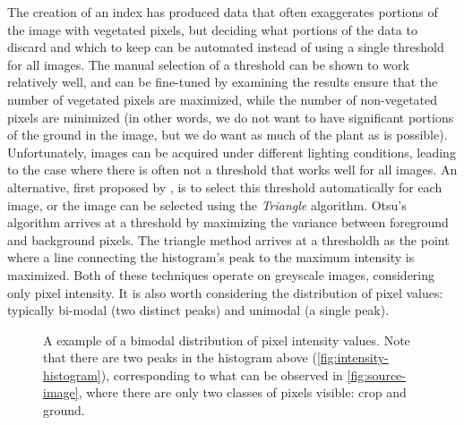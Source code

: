 \documentclass[letterpaper]{article}
\begin{document}
{{The creation of an index has produced data that often exaggerates portions of the image with vegetated pixels, but deciding what portions of the data to discard and which to keep can be automated instead of using a single threshold for all images. The manual selection of a threshold can be shown to work relatively well, and can be fine-tuned by examining the results ensure that the number of vegetated pixels are maximized, while the number of non-vegetated pixels are minimized (in other words, we do not want to have significant portions of the ground in the image, but we do want as much of the plant as is possible). Unfortunately, images can be acquired under different lighting conditions, leading to the case where there is often not a threshold that works well for all images. An alternative, first proposed by \citeauthor{Otsu1979-io}  \cite{Otsu1979-io}, is to select this threshold automatically for each image, or the image can be selected using the \textit{Triangle} algorithm. Otsu's algorithm arrives at a threshold by maximizing the variance between foreground and background pixels. The triangle method arrives at a thresholdh as the point where a line connecting the histogram’s peak to the maximum intensity is maximized. Both of these techniques operate on greyscale images, considering only pixel intensity. It is also worth considering the distribution of pixel values: typically bi-modal (two distinct peaks) and unimodal (a single peak).

%

\begin{figure}[h]
	\centering
	\hfill
	\caption[Bimodal distribution of pixel intensity]{A example of a bimodal distribution of pixel intensity values. Note that there are two peaks in the histogram above (\ref{fig:intensity-histogram}), corresponding to what can be observed in \ref{fig:source-image}, where there are only two classes of pixels visible: crop and ground.}
	\label{fig:intensity}
\end{figure}

}}
\end{document}
